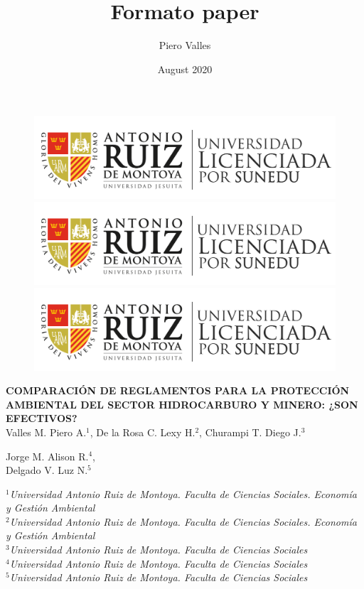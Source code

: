 \documentclass[12pt, a4paper]{article} %
\title{Formato paper}
\author{Piero Valles}
\date{August 2020}
\begin{document}
    \begin{figure}[H]
    	\centering
        \includegraphics[scale=0.12]{logo_ruiz.png}
        \hfill
        \includegraphics[scale=0.12]{logo_ruiz.png}
        \hfill
        \includegraphics[scale=0.12]{logo_ruiz.png}
    \end{figure}
    
    \vspace{2mm}
    
    \begin{center}
        \textbf{\large COMPARACIÓN DE REGLAMENTOS PARA LA PROTECCIÓN AMBIENTAL DEL SECTOR HIDROCARBURO Y MINERO: ¿SON EFECTIVOS?}\\
        \vspace{5mm}
        Valles M. Piero A.$^1$, De la Rosa C. Lexy H.$^2$, Churampi T. Diego J.$^3$\\
    
        \vspace{5mm}
        
        Jorge M. Alison R.$^4$,\\ Delgado V. Luz N.$^5$ \\
        
        \vspace{5mm}
        
        $^1$\textit{Universidad Antonio Ruiz de Montoya. Faculta de Ciencias Sociales. Economía y Gestión Ambiental}\\
        $^2$\textit{Universidad Antonio Ruiz de Montoya. Faculta de Ciencias Sociales. Economía y Gestión Ambiental}\\
        $^3$\textit{Universidad Antonio Ruiz de Montoya. Faculta de Ciencias Sociales}\\
        $^4$\textit{Universidad Antonio Ruiz de Montoya. Faculta de Ciencias Sociales}\\
        $^5$\textit{Universidad Antonio Ruiz de Montoya. Faculta de Ciencias Sociales}\\
    \end{center}
    
\end{document}
